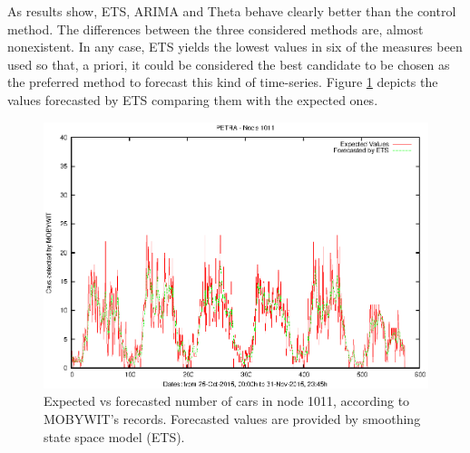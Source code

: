 \documentclass[preprint]{elsarticle}
\begin{document}
As results show, ETS, ARIMA and Theta behave clearly better than the control method. The differences between the three considered methods are, almost nonexistent. In any case, ETS yields the lowest values in six of the measures been used so that, a priori, it could be considered the best candidate to be chosen as the preferred method to forecast this kind of time-series. Figure \ref{fig:forecasted-values} depicts the values forecasted by ETS comparing them with the expected ones.

\begin{figure}[!ht]
	\begin{center}
		\includegraphics[width=14cm]{imgs/PETRA/forecasting-PETRA-1011.eps}
		\caption{Expected vs forecasted number of cars in node 1011, according to MOBYWIT's records. Forecasted values are provided by smoothing state space model (ETS). }
		\label{fig:forecasted-values}
	\end{center}
\end{figure}
\end{document}
